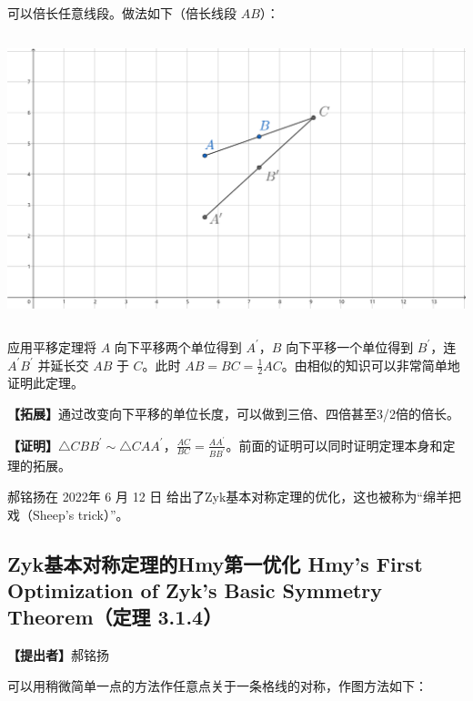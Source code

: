 \documentclass[UTF8]{article}
\begin{document}
可以倍长任意线段。做法如下（倍长线段 \(AB\)）：

\includegraphics[width=5.76806in,height=3.27847in]{media/image7.png}

应用平移定理将 \(A\) 向下平移两个单位得到 \(A^{'}\)，\(B\)
向下平移一个单位得到 \(B^{'}\)，连 \(A^{'}B^{'}\) 并延长交 \(AB\) 于
\(C\)。此时
\(AB = BC = \frac{1}{2}AC\)。由相似的知识可以非常简单地证明此定理。

\textbf{【拓展】}通过改变向下平移的单位长度，可以做到三倍、四倍甚至3/2倍的倍长。

\textbf{【证明】}\(\bigtriangleup CBB^{'} \sim \bigtriangleup CAA^{'}\)，\(\frac{AC}{BC} = \frac{AA^{'}}{BB^{'}}\)。前面的证明可以同时证明定理本身和定理的拓展。

郝铭扬在 2022年 6 月 12 日
给出了Zyk基本对称定理的优化，这也被称为``绵羊把戏（Sheep's trick）''。

\hypertarget{zykux57faux672cux5bf9ux79f0ux5b9aux7406ux7684hmyux7b2cux4e00ux4f18ux5316-hmys-first-optimization-of-zyks-basic-symmetry-theoremux5b9aux7406-3.1.4}{%
\subsection{Zyk基本对称定理的Hmy第一优化 Hmy's First Optimization of
Zyk's Basic Symmetry Theorem（定理
3.1.4）}\label{zykux57faux672cux5bf9ux79f0ux5b9aux7406ux7684hmyux7b2cux4e00ux4f18ux5316-hmys-first-optimization-of-zyks-basic-symmetry-theoremux5b9aux7406-3.1.4}}

\textbf{【提出者】}郝铭扬

可以用稍微简单一点的方法作任意点关于一条格线的对称，作图方法如下：
\end{document}
